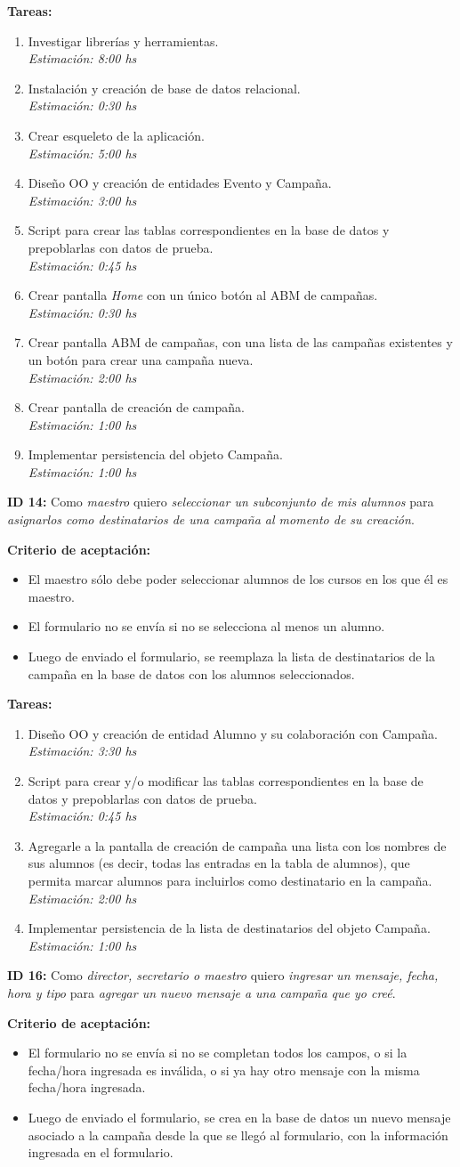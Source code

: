 \documentclass[a4paper, 10pt, twoside]{article}
\newcommand{\sprintstory}[4]{
  \noindent
  \textbf{ID #1:} Como \emph{#2} quiero \emph{#3} para \emph{#4}.
}
\newenvironment{criterios}{
  \textbf{Criterio de aceptación:}
  \begin{itemize}
}{
  \end{itemize}
}
\newcommand{\criterio}[1] {
  \item #1
}
\newenvironment{tasks}{
  \textbf{Tareas:}
  \begin{enumerate}
}{
  \end{enumerate}
}
\newcommand{\task}[2] {
  \item #1.\\
  \emph{Estimación: #2 hs}
}
\begin{document}
\begin{tasks}
  \task{Investigar librerías y herramientas}{8:00}
  \task{Instalación y creación de base de datos relacional}{0:30}
  \task{Crear esqueleto de la aplicación}{5:00}
  \task{Diseño OO y creación de entidades Evento y Campaña}{3:00}
  \task{Script para crear las tablas correspondientes en la base de datos y prepoblarlas con datos de prueba}{0:45}
  \task{Crear pantalla \emph{Home} con un único botón al ABM de campañas}{0:30}
  \task{Crear pantalla ABM de campañas, con una lista de las campañas existentes y un botón para crear una campaña nueva}{2:00}
  \task{Crear pantalla de creación de campaña}{1:00}
  \task{Implementar persistencia del objeto Campaña}{1:00}
\end{tasks}


\sprintstory{14}
            {maestro}
            {seleccionar un subconjunto de mis alumnos}
            {asignarlos como destinatarios de una campaña al momento de su creación}

\begin{criterios}
  \criterio{El maestro sólo debe poder seleccionar alumnos de los cursos en los que él es maestro.}
  \criterio{El formulario no se envía si no se selecciona al menos un alumno.}
  \criterio{Luego de enviado el formulario, se reemplaza la lista de destinatarios de la campaña en la base de datos con los alumnos seleccionados.}
\end{criterios}

\begin{tasks}
  \task{Diseño OO y creación de entidad Alumno y su colaboración con Campaña}{3:30}
  \task{Script para crear y/o modificar las tablas correspondientes en la base de datos y prepoblarlas con datos de prueba}{0:45}
  \task{Agregarle a la  pantalla de creación de campaña una lista con los nombres de sus alumnos (es decir, todas las entradas en la tabla de alumnos), que permita marcar alumnos para incluirlos como destinatario en la campaña}{2:00}
  \task{Implementar persistencia de la lista de destinatarios del objeto Campaña}{1:00}
\end{tasks}


\sprintstory{16}
            {director, secretario o maestro}
            {ingresar un mensaje, fecha, hora y tipo}
            {agregar un nuevo mensaje a una campaña que yo creé}

\begin{criterios}
  \criterio{El formulario no se envía si no se completan todos los campos, o si la fecha/hora ingresada es inválida, o si ya hay otro mensaje con la misma fecha/hora ingresada.}
  \criterio{Luego de enviado el formulario, se crea en la base de datos un nuevo mensaje asociado a la campaña desde la que se llegó al formulario, con la información ingresada en el formulario.}
\end{criterios}
\end{document}
